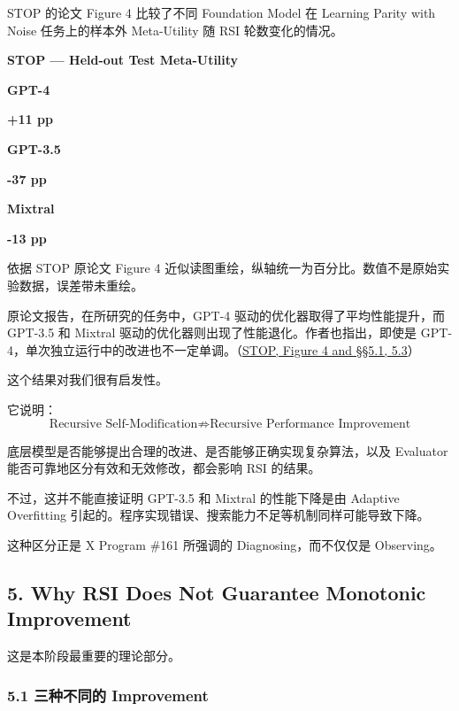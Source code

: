 STOP 的论文 Figure 4 比较了不同 Foundation Model 在 Learning Parity with Noise 任务上的样本外 Meta-Utility 随 RSI 轮数变化的情况。

\textbf{STOP --- Held-out Test Meta-Utility}

\textbf{GPT-4}

\textbf{+11 pp}


\textbf{GPT-3.5}

\textbf{-37 pp}


\textbf{Mixtral}

\textbf{-13 pp}


依据 STOP 原论文 Figure 4 近似读图重绘，纵轴统一为百分比。数值不是原始实验数据，误差带未重绘。

原论文报告，在所研究的任务中，GPT-4 驱动的优化器取得了平均性能提升，而 GPT-3.5 和 Mixtral 驱动的优化器则出现了性能退化。作者也指出，即使是 GPT-4，单次独立运行中的改进也不一定单调。（\href{https://xychen5.github.io/papers/originals/2310.02304-self-taught-optimizer.pdf#page=5}{STOP, Figure 4 and §§5.1, 5.3}）

这个结果对我们很有启发性。

它说明：
\[\boxed{
\text{Recursive Self-Modification}
\not\Rightarrow
\text{Recursive Performance Improvement}
}\]

底层模型是否能够提出合理的改进、是否能够正确实现复杂算法，以及 Evaluator 能否可靠地区分有效和无效修改，都会影响 RSI 的结果。

不过，这并不能直接证明 GPT-3.5 和 Mixtral 的性能下降是由 Adaptive Overfitting 引起的。程序实现错误、搜索能力不足等机制同样可能导致下降。

这种区分正是 X Program \#161 所强调的 Diagnosing，而不仅仅是 Observing。

\hypertarget{part-3-37-0001-why-rsi-does-not-guarantee-monotonic-improvement}{%
\subsection{5. Why RSI Does Not Guarantee Monotonic Improvement}\label{part-3-37-0001-why-rsi-does-not-guarantee-monotonic-improvement}}

这是本阶段最重要的理论部分。

\hypertarget{part-3-37-0001-ux4e09ux79cdux4e0dux540cux7684-improvement}{%
\subsubsection{5.1 三种不同的 Improvement}\label{part-3-37-0001-ux4e09ux79cdux4e0dux540cux7684-improvement}}

